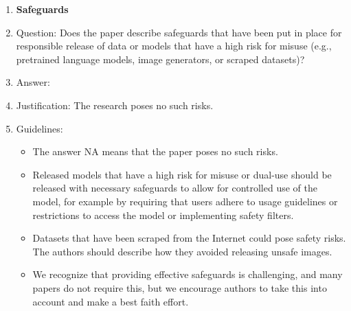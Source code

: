 \documentclass{article}
\begin{document}
\begin{enumerate}
\item {\bf Safeguards}
    \item[] Question: Does the paper describe safeguards that have been put in place for responsible release of data or models that have a high risk for misuse (e.g., pretrained language models, image generators, or scraped datasets)?
    \item[] Answer: \answerNA{} %
    \item[] Justification: The research poses no such risks.
    \item[] Guidelines:
    \begin{itemize}
        \item The answer NA means that the paper poses no such risks.
        \item Released models that have a high risk for misuse or dual-use should be released with necessary safeguards to allow for controlled use of the model, for example by requiring that users adhere to usage guidelines or restrictions to access the model or implementing safety filters. 
        \item Datasets that have been scraped from the Internet could pose safety risks. The authors should describe how they avoided releasing unsafe images.
        \item We recognize that providing effective safeguards is challenging, and many papers do not require this, but we encourage authors to take this into account and make a best faith effort.
    \end{itemize}


\end{enumerate}
\end{document}
